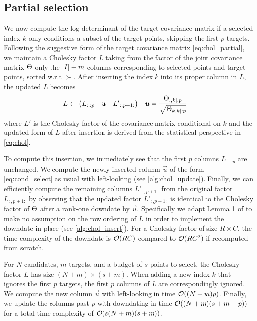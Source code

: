 \documentclass[review,supplement,onefignum,onetabnum]{siamonline220329}
\begin{document}

\subsection{Partial selection}
\label{subsec:partial_select}

We now compute the log determinant of the target covariance
matrix if a selected index \( k \) only conditions a subset
of the target points, skipping the first \( p \) targets.
Following the suggestive form of the target covariance matrix
\cref{eq:chol_partial}, we maintain a Cholesky factor \( L \)
taking from the factor of the joint covariance matrix \( \Theta \)
only the \( \lvert I\rvert + m \) columns corresponding to selected
points and target points, sorted w.r.t \( \succ \).
After inserting the index \( k \) into its proper
column in \( L \), the updated \( L \) becomes
\begin{align}
  \label{eq:chol_partial_update}
  L &\gets
  \begin{pmatrix}
    L_{:, :p} & \vec{u} & {L'}_{:, p + 1:}
  \end{pmatrix} &
    \vec{u} &= \frac{\CM_{:, k \mid :p}}{\sqrt{\CM_{k, k \mid :p}}}
\end{align}
where \( L' \) is the Cholesky factor of the covariance matrix
conditional on \( k \) and the updated form of \( L \) after insertion
is derived from the statistical perspective in \cref{eq:chol}.

To compute this insertion, we immediately see that the
first \( p \) columns \( L_{:, :p} \) are unchanged.
We compute the newly inserted column \( \vec{u} \) of the form
\cref{eq:cond_select} as usual with left-looking (see \cref{alg:chol_update}).
Finally, we can efficiently compute the remaining columns \( {L'}_{:, p +
1:} \) from the original factor \( L_{:, p + 1:} \) by observing that the
updated factor \( {L'}_{:, p + 1:} \) is identical to the Cholesky factor
of \( \Theta \) after a rank-one downdate by \( \vec{u} \).
Specifically we adapt Lemma 1 of \cite{krause2015more} to make
no assumption on the row ordering of \( L \) in order to
implement the downdate in-place (see \cref{alg:chol_insert}).
For a Cholesky factor of size \( R \times C \), the time
complexity of the downdate is \( \mathcal{O}(R C) \) compared
to \( \mathcal{O}(R C^2) \) if recomputed from scratch.

For \( N \) candidates, \( m \) targets, and a budget of \( s \) points to
select, the Cholesky factor \( L \) has size \( (N + m) \times (s + m) \).
When adding a new index \( k \) that ignores the first \( p \) targets,
the first \( p \) columns of \( L \) are correspondingly ignored.
We compute the new column \( \vec{u} \) with
left-looking in time \( \mathcal{O}((N + m) p) \).
Finally, we update the columns past \( p \) with
downdating in time \( \mathcal{O}((N + m) (s + m - p)) \) for
a total time complexity of \( \mathcal{O}(s(N + m)(s + m)) \).
\end{document}
